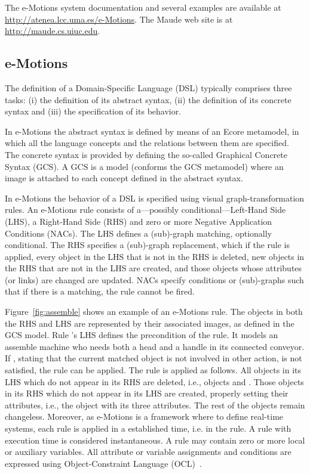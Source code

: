 The e-Motions system documentation and several examples are available at \url{http://atenea.lcc.uma.es/e-Motions}. The Maude web site is at \url{http://maude.cs.uiuc.edu}.

\subsection{e-Motions}\label{sub:emotions}

The definition of a Domain-Specific Language (DSL) typically comprises three tasks: (i) the definition of its abstract syntax, (ii) the definition of its concrete syntax and (iii) the specification of its behavior.

In e-Motions the abstract syntax is defined by means of an Ecore metamodel, in which all the language concepts and the relations between them are specified. The concrete syntax is provided by defining the so-called Graphical Concrete Syntax (GCS). A GCS is a model (conforms the GCS metamodel) where an image is attached to each concept defined in the abstract syntax.

In e-Motions the behavior of a DSL is specified using visual graph-transformation rules. An e-Motions rule consists of a---possibly conditional---Left-Hand Side (LHS), a Right-Hand Side (RHS) and zero or more Negative Application Conditions (NACs). The LHS defines a (sub)-graph matching, optionally conditional. The RHS specifies a (sub)-graph replacement, which if the rule is applied, every object in the LHS that is not in the RHS is deleted, new objects in the RHS that are not in the LHS are created, and those objects whose attributes (or links) are changed are updated. NACs specify conditions or (sub)-graphs such that if there is a matching, the rule cannot be fired.

Figure~\ref{fig:assemble} shows an example of an e-Motions rule. The objects in both the RHS and LHS are represented by their associated images, as defined in the GCS model. Rule 's LHS defines the precondition of the rule. It models an assemble machine who needs both a head and a handle in its connected conveyor. If , stating that the current matched  object is not involved in other  action, is not satisfied, the rule can be applied. The rule is applied as follows. All objects in its LHS which do not appear in its RHS are deleted, i.e., objects  and . Those objects in its RHS which do not appear in its LHS are created, properly setting their attributes, i.e., the  object with its three attributes. The rest of the objects remain changeless. Moreover, as e-Motions is a framework where to define real-time systems, each rule is applied in a established time, i.e.  in the  rule. A rule with execution time \code{[0,0]} is considered instantaneous. A rule may contain zero or more local or auxiliary variables. All attribute or variable assignments and conditions are expressed using Object-Constraint Language (OCL)~\cite{ocl}.

